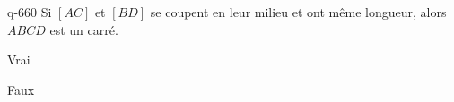 \begin{truefalse}{q-660}
Si $[AC]$ et $[BD]$ se coupent en leur milieu et ont même longueur, alors $ABCD$ est un carré.
\item Vrai
\item* Faux
\end{truefalse}


